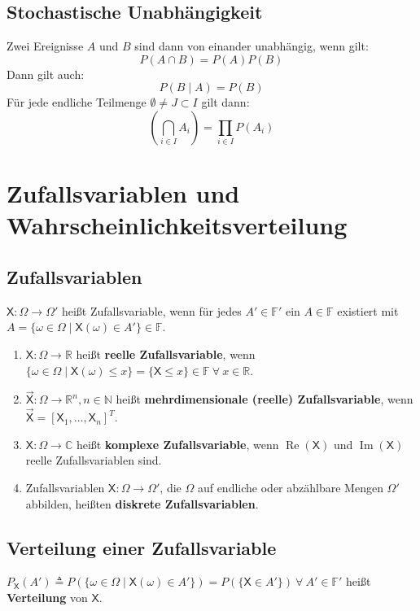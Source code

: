 \documentclass[a4paper,twocolumn,10pt]{article}
\newenvironment{abc}{\begin{enumerate}[label={\alph*)}]}{\end{enumerate}}
\begin{document}
\subsection{Stochastische Unabhängigkeit}
Zwei Ereignisse $A$ und $B$ sind dann von einander unabhängig, wenn gilt: \[P(A \cap B) = P(A)P(B) \]
Dann gilt auch: \[P(B \mid A) = P(B) \]
Für jede endliche Teilmenge $\emptyset \neq J\subset I$ gilt dann:
 \[(\bigcap_{i \in I} A_i) = \prod_{i \in I} P(A_i) \]

\section{Zufallsvariablen und Wahrscheinlichkeitsverteilung}

\subsection{Zufallsvariablen}
$\mathsf X : \Omega \rightarrow \Omega'$ heißt Zufallsvariable, wenn für jedes $A' \in \mathbb F'$ ein $A \in \mathbb F$ existiert mit $A = \{\omega \in \Omega \mid \mathsf X(\omega) \in A'\} \in \mathbb F$.
\begin{abc}
\item $\mathsf X : \Omega \rightarrow \mathbb R$ heißt \textbf{reelle Zufallsvariable}, wenn $\{\omega \in \Omega \mid \mathsf X(\omega) \leq x\} = \{\mathsf X \leq x \} \in \mathbb F\ \forall\ x \in \mathbb R$.
\item $\vec{\mathsf X} : \Omega \rightarrow \mathbb R^n, n \in \mathbb N$ heißt \textbf{mehrdimensionale (reelle) Zufallsvariable}, wenn $ \vec{\mathsf X} = [\mathsf X_1,\dots,\mathsf X_n]^T$.
\item $\mathsf X : \Omega \rightarrow \mathbb C$ heißt \textbf{komplexe Zufallsvariable}, wenn $\operatorname{Re}(\mathsf X)$ und $\operatorname{Im}(\mathsf X)$ reelle Zufallsvariablen sind.
\item Zufallsvariablen $\mathsf X : \Omega \rightarrow \Omega'$, die $\Omega$ auf endliche oder abzählbare Mengen $\Omega'$ abbilden, heißten \textbf{diskrete Zufallsvariablen}.
\end{abc}

\subsection{Verteilung einer Zufallsvariable}
$P_\mathsf{X}(A')  \triangleq P(\{\omega \in \Omega \mid \mathsf{X}(\omega) \in A'\}) = P(\{\mathsf{X} \in A'\})\ \forall\ A' \in \mathbb F'$ heißt \textbf{Verteilung} von $\mathsf{X}$.
\end{document}
